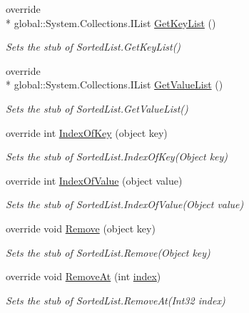 \begin{DoxyCompactItemize}
override \\*
global\-::\-System.\-Collections.\-I\-List \hyperlink{class_system_1_1_collections_1_1_fakes_1_1_stub_sorted_list_a03758e86d6cd826deedba8f3e7f7b4cb}{Get\-Key\-List} ()
\begin{DoxyCompactList}\small\item\em Sets the stub of Sorted\-List.\-Get\-Key\-List()\end{DoxyCompactList}\item 
override \\*
global\-::\-System.\-Collections.\-I\-List \hyperlink{class_system_1_1_collections_1_1_fakes_1_1_stub_sorted_list_a077c633b62d261d7feb1cf069277e910}{Get\-Value\-List} ()
\begin{DoxyCompactList}\small\item\em Sets the stub of Sorted\-List.\-Get\-Value\-List()\end{DoxyCompactList}\item 
override int \hyperlink{class_system_1_1_collections_1_1_fakes_1_1_stub_sorted_list_a165eed7786881ec7082c3c7591b95a4f}{Index\-Of\-Key} (object key)
\begin{DoxyCompactList}\small\item\em Sets the stub of Sorted\-List.\-Index\-Of\-Key(\-Object key)\end{DoxyCompactList}\item 
override int \hyperlink{class_system_1_1_collections_1_1_fakes_1_1_stub_sorted_list_a2d5a613ca8cf88c99afbee0ce4345a71}{Index\-Of\-Value} (object value)
\begin{DoxyCompactList}\small\item\em Sets the stub of Sorted\-List.\-Index\-Of\-Value(\-Object value)\end{DoxyCompactList}\item 
override void \hyperlink{class_system_1_1_collections_1_1_fakes_1_1_stub_sorted_list_a6558b85a8ed88a300e04161e9fbf1152}{Remove} (object key)
\begin{DoxyCompactList}\small\item\em Sets the stub of Sorted\-List.\-Remove(\-Object key)\end{DoxyCompactList}\item 
override void \hyperlink{class_system_1_1_collections_1_1_fakes_1_1_stub_sorted_list_ac446f500014613c58fd345a03048116c}{Remove\-At} (int \hyperlink{jquery-1_810_82-vsdoc_8js_a75bb12d1f23302a9eea93a6d89d0193e}{index})
\begin{DoxyCompactList}\small\item\em Sets the stub of Sorted\-List.\-Remove\-At(\-Int32 index)\end{DoxyCompactList}\item 

\end{DoxyCompactItemize}
